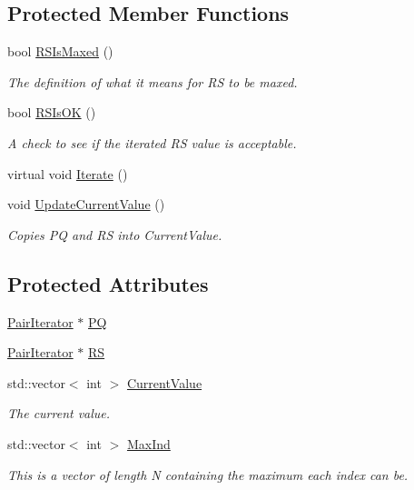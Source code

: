 \subsection*{Protected Member Functions}
\begin{DoxyCompactItemize}
\item 
bool \hyperlink{classJKBuilder_1_1AtomQuartetIterator_a458dcf49c4c4bbb1e3d3d39d3dc086c9}{RSIsMaxed} ()
\begin{DoxyCompactList}\small\item\em The definition of what it means for RS to be maxed. \item\end{DoxyCompactList}\item 
bool \hyperlink{classJKBuilder_1_1AtomQuartetIterator_a13e657ea529c0566a0bf48e9c5a488d7}{RSIsOK} ()
\begin{DoxyCompactList}\small\item\em A check to see if the iterated RS value is acceptable. \item\end{DoxyCompactList}\item 
virtual void \hyperlink{classJKBuilder_1_1QuartetIterator_a7874a07e98b52f4f147cde6f39353bae}{Iterate} ()
\item 
void \hyperlink{classJKBuilder_1_1QuartetIterator_a1af5c865d6e9cfe63d0dedc53bdc13ba}{UpdateCurrentValue} ()
\begin{DoxyCompactList}\small\item\em Copies PQ and RS into CurrentValue. \item\end{DoxyCompactList}\end{DoxyCompactItemize}
\subsection*{Protected Attributes}
\begin{DoxyCompactItemize}
\item 
\hyperlink{classJKBuilder_1_1PairIterator}{PairIterator} $\ast$ \hyperlink{classJKBuilder_1_1QuartetIterator_a84f5c3632fba19d3bb85e1cffb9e51f7}{PQ}
\item 
\hyperlink{classJKBuilder_1_1PairIterator}{PairIterator} $\ast$ \hyperlink{classJKBuilder_1_1QuartetIterator_a26b777bf7ea22524f1cc725020ee2082}{RS}
\item 
std::vector$<$ int $>$ \hyperlink{classJKBuilder_1_1Iterator_a20ca24f6d827aba144bb087c4bcb74a0}{CurrentValue}
\begin{DoxyCompactList}\small\item\em The current value. \item\end{DoxyCompactList}\item 
std::vector$<$ int $>$ \hyperlink{classJKBuilder_1_1Iterator_ab6b56d3c4e9353bc938dd6249cde9ca0}{MaxInd}
\begin{DoxyCompactList}\small\item\em This is a vector of length N containing the maximum each index can be. \item\end{DoxyCompactList}\end{DoxyCompactItemize}


